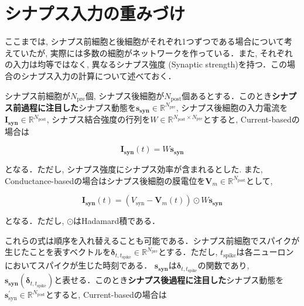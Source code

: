 \section{シナプス入力の重みづけ
}


ここまでは, シナプス前細胞と後細胞がそれぞれ1つずつである場合について考えていたが, 実際には多数の細胞がネットワークを作っている．また, それぞれの入力は均等ではなく, 異なるシナプス強度 (Synaptic strength)を持つ．この場合のシナプス入力の計算について述べておく．



シナプス前細胞が$N_{\text{pre}}$個, シナプス後細胞が$N_{\text{post}}$個あるとする．このとき\textbf{シナプス前過程に注目した}シナプス動態を$\boldsymbol{s_{\text{syn}}}\in \mathbb{R}^{N_{\text{pre}}}$, シナプス後細胞の入力電流を$\boldsymbol{I_{\text{syn}}}\in \mathbb{R}^{N_{\text{post}}}$, シナプス結合強度の行列を$W\in \mathbb{R}^{N_{\text{post}} \times N_{\text{pre}}}$とすると, Current-basedの場合は





\begin{equation}

\boldsymbol{I_{\text{syn}}}(t)=W \boldsymbol{s_{\text{syn}}}  

\end{equation}





となる．ただし, シナプス強度にシナプス効率が含まれるとした. また, Conductance-basedの場合はシナプス後細胞の膜電位を$\boldsymbol{V}_{m}\in \mathbb{R}^{N_{\text{post}}}$として, 





\begin{equation}

\boldsymbol{I_{\text{syn}}}(t)=\left(V_{\text{syn}}-\boldsymbol{V}_{m}(t)\right)\odot W \boldsymbol{s_{\text{syn}}}

\end{equation}





となる．ただし, $\odot$はHadamard積である．



これらの式は順序を入れ替えることも可能である．シナプス前細胞でスパイクが生じたことを表すベクトルを$\boldsymbol{\delta}_{t,t_{\text{spike}}}\in \mathbb{R}^{N_{\text{pre}}}$とする．ただし, $t_{\text{spike}}$は各ニューロンにおいてスパイクが生じた時刻である． $\boldsymbol{s_{\text{syn}}}$は$\boldsymbol{\delta}_{t,t_{\text{spike}}}$の関数であり, $\boldsymbol{s_{\text{syn}}}(\boldsymbol{\delta}_{t,t_{\text{spike}}})$と表せる．このとき\textbf{シナプス後過程に注目した}シナプス動態を$\boldsymbol{s}^\prime_{\text{syn}}\in \mathbb{R}^{N_{\text{post}}}$とすると, Current-basedの場合は





